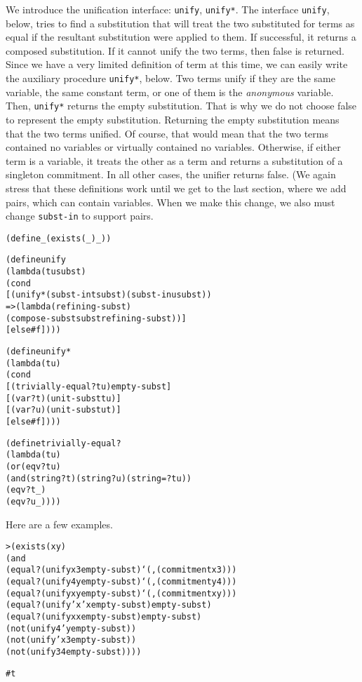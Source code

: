We introduce the unification interface: \texttt{unify},
\texttt{unify*}.  The interface \texttt{unify}, below, tries to find a
substitution that will treat the two substituted for terms as equal if
the resultant substitution were applied to them.  If successful, it
returns a composed substitution.  If it cannot unify the two terms,
then false is returned.  Since we have a very limited definition of
term at this time, we can easily write the auxiliary procedure
\texttt{unify*}, below.  Two terms unify if they are the same
variable, the same constant term, or one of them is the
\emph{anonymous} variable.  Then, \texttt{unify*} returns the empty
substitution.  That is why we do not choose false to represent the
empty substitution.  Returning the empty substitution means that the
two terms unified.  Of course, that would mean that the two terms
contained no variables or virtually contained no variables.
Otherwise, if either term is a variable, it treats the other as a term
and returns a substitution of a singleton commitment. In all other
cases, the unifier returns false.  (We again stress that these
definitions work until we get to the last section, where we add pairs,
which can contain variables.  When we make this change, we also must
change \texttt{subst-in} to support pairs.
\newpage
\begin{alltt}
(define _ (exists (_) _))

(define unify
  (lambda (t u subst)
    (cond
      [(unify* (subst-in t subst) (subst-in u subst))
       => (lambda (refining-subst)
            (compose-subst subst refining-subst))]
      [else #f])))
\end{alltt}

\begin{alltt}
(define unify*
  (lambda (t u)
    (cond
      [(trivially-equal? t u) empty-subst]
      [(var? t) (unit-subst t u)]
      [(var? u) (unit-subst u t)]
      [else #f])))
\end{alltt}

\begin{alltt}
(define trivially-equal?
  (lambda (t u)
    (or (eqv? t u)
        (and (string? t) (string? u) (string=? t u))
        (eqv? t _)
        (eqv? u _))))
\end{alltt}

Here are a few examples.

\begin{alltt}
> (exists (x y)
    (and
      (equal? (unify x 3 empty-subst) `(,(commitment x 3)))
      (equal? (unify 4 y empty-subst) `(,(commitment y 4)))
      (equal? (unify x y empty-subst) `(,(commitment x y)))
      (equal? (unify 'x 'x empty-subst) empty-subst)
      (equal? (unify x x empty-subst) empty-subst)
      (not (unify 4 'y empty-subst))
      (not (unify 'x 3 empty-subst))
      (not (unify 3 4 empty-subst))))

#t
\end{alltt}

